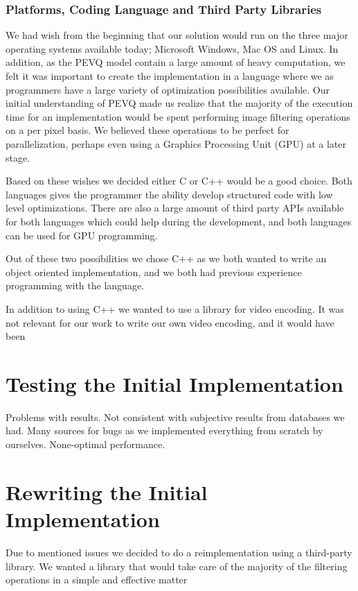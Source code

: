 \subsection{Platforms, Coding Language and Third Party Libraries}
We had wish from the beginning that our solution would run on the three major operating systems available today; Microsoft Windows, Mac OS and Linux. In addition, as the PEVQ model contain a large amount of heavy computation, we felt it was important to create the implementation in a language where we as programmers have a large variety of optimization possibilities available. Our initial understanding of PEVQ made us realize that the majority of the execution time for an implementation would be spent performing image filtering operations on a per pixel basis. We believed these operations to be perfect for parallelization, perhaps even using a Graphics Processing Unit (GPU) at a later stage.

Based on these wishes we decided either C or C++ would be a good choice. Both languages gives the programmer the ability develop structured code with low level optimizations. There are also a large amount of third party APIs available for both languages which could help during the development, and both languages can be used for GPU programming. 

Out of these two possibilities we chose C++ as we both wanted to write an object oriented implementation, and we both had previous experience programming with the language. 

In addition to using C++ we wanted to use a library for video encoding. It was not relevant for our work to write our own video encoding, and it would have been 



\chapter{Testing the Initial Implementation}
       
Problems with results. Not consistent with subjective results from databases we had.
Many sources for bugs as we implemented everything from scratch by ourselves. 
None-optimal performance.

\chapter{Rewriting the Initial Implementation}

Due to mentioned issues we decided to do a reimplementation using a third-party library. We wanted a library that would take care of the majority of the filtering operations in a simple and effective matter

